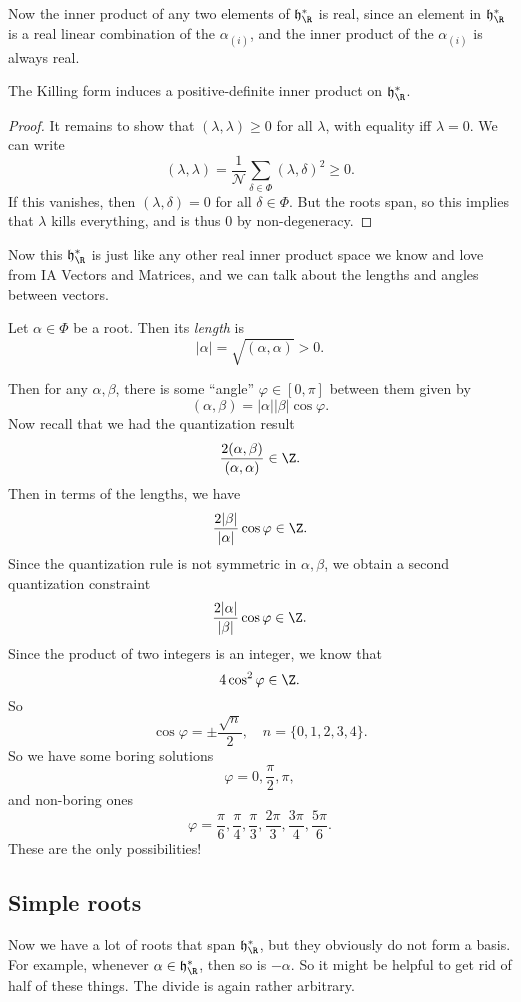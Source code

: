 \documentclass[a4paper]{article}
\begin{document}
Now the inner product of any two elements of $\mathfrak{h}_\R^*$ is real, since an element in $\mathfrak{h}_\R^*$ is a real linear combination of the $\alpha_{(i)}$, and the inner product of the $\alpha_{(i)}$ is always real.

\begin{prop}
  The Killing form induces a positive-definite inner product on $\mathfrak{h}_\R^*$.
\end{prop}

\begin{proof}
  It remains to show that $(\lambda, \lambda) \geq 0$ for all $\lambda$, with equality iff $\lambda = 0$. We can write
  \[
    (\lambda, \lambda) = \frac{1}{\mathcal{N}} \sum_{\delta \in \Phi}(\lambda, \delta)^2 \geq 0.
  \]
  If this vanishes, then $(\lambda, \delta) = 0$ for all $\delta \in \Phi$. But the roots span, so this implies that $\lambda$ kills everything, and is thus $0$ by non-degeneracy.
\end{proof}

Now this $\mathfrak{h}_\R^*$ is just like any other real inner product space we know and love from IA Vectors and Matrices, and we can talk about the lengths and angles between vectors.

\begin{defi}
  Let $\alpha \in \Phi$ be a root. Then its \emph{length} is
  \[
    |\alpha| = \sqrt{(\alpha, \alpha)} > 0.
  \]
\end{defi}

Then for any $\alpha, \beta$, there is some ``angle'' $\varphi \in [0, \pi]$ between them given by
\[
  (\alpha, \beta) = |\alpha||\beta| \cos \varphi.
\]
Now recall that we had the quantization result
\[
  \frac{2(\alpha, \beta)}{(\alpha, \alpha)} \in \Z.
\]
Then in terms of the lengths, we have
\[
  \frac{2 |\beta|}{|\alpha|} \cos \varphi \in \Z.
\]
Since the quantization rule is not symmetric in $\alpha, \beta$, we obtain a second quantization constraint
\[
  \frac{2|\alpha|}{|\beta|} \cos \varphi \in \Z.
\]
Since the product of two integers is an integer, we know that
\[
  4 \cos^2 \varphi \in \Z.
\]
So
\[
  \cos \varphi = \pm \frac{\sqrt{n}}{2}, \quad n = \{0, 1, 2, 3, 4\}.
\]
So we have some boring solutions
\[
  \varphi = 0, \frac{\pi}{2}, \pi,
\]
and non-boring ones
\[
  \varphi = \frac{\pi}{6}, \frac{\pi}{4}, \frac{\pi}{3}, \frac{2\pi}{3}, \frac{3 \pi}{4}, \frac{5 \pi}{6}.
\]
These are the only possibilities!

\subsection{Simple roots}
Now we have a lot of roots that span $\mathfrak{h}^*_\R$, but they obviously do not form a basis. For example, whenever $\alpha \in \mathfrak{h}^*_\R$, then so is $-\alpha$. So it might be helpful to get rid of half of these things. The divide is again rather arbitrary.
\end{document}
